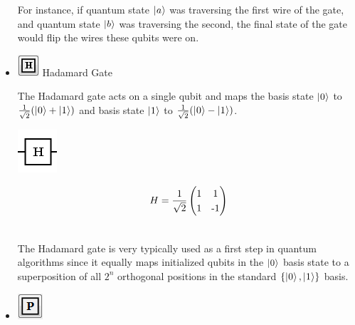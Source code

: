 \documentclass[10pt]{article}
\theoremstyle{definition}
\newcommand{\microspace}{\mspace{0.5mu}}
\def \lket {\left|}
\def \rket {\right\rangle}
\newcommand{\ket}[1]{\lket\microspace #1 \microspace\rket}
\begin{document}
\begin{itemize}
For instance, if quantum state $\ket{a}$ was traversing the first wire of the gate, and quantum state $\ket{b}$ was traversing the second, the final state of the gate would flip the wires these qubits were on. 

\item \includegraphics{Figures/Gates/Hadamard.png}  Hadamard Gate

The Hadamard gate acts on a single qubit and maps the basis state $\ket{0}$ to $\frac{1}{\sqrt 2}(\ket{0} + \ket{1})$ and basis state $\ket{1}$ to $\frac{1}{\sqrt 2}(\ket{0} - \ket{1})$. 

\begin{center}
\includegraphics[scale=.7]{Figures/Gates/HadamardViewer} \\
  \begin{minipage}{.9\linewidth}
    \begin{equation*} \label{mat:Hadamard}
    \renewcommand{\arraystretch}{1.25}
H =  \frac{1}{\sqrt 2}\begin{pmatrix} 1 & 1 \\ 1 & \textnormal{-}1 \end{pmatrix}
    \end{equation*}
  \end{minipage}\hspace{-2.5cm}
  \begin{minipage}{.2\linewidth}
  \vspace*{3pt}
    \begin{align}
    \end{align}
  \end{minipage}
\end{center}

The Hadamard gate is very typically used as a first step in quantum algorithms since it equally maps initialized qubits in the $\ket{0}$ basis state to a superposition of all $2^n$ orthogonal positions in the standard $\{\ket{0}, \ket{1}\}$ basis.

\item \includegraphics{Figures/Gates/PGate.png} 


\end{itemize}
\end{document}
